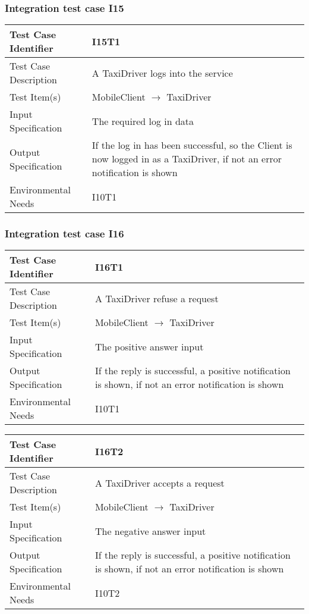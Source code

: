 		\subsubsection{Integration test case I15}
		\begin{center}
			\begin{tabular}{ |l p{10cm}| } \hline
				Test Case Identifier & I15T1 \\ \hline
				Test Case Description & A TaxiDriver logs into the service \\ \hline
				Test Item(s) & MobileClient $\rightarrow$ TaxiDriver \\ \hline
				Input Specification & The required log in data  \\ \hline
				Output Specification & If the log in has been successful, so the Client is now logged in as a TaxiDriver, if not an
				error notification is shown \\ \hline
				Environmental Needs & I10T1 \\ \hline
			\end{tabular}
		\end{center}
		\subsubsection{Integration test case I16}
		\begin{center}
			\begin{tabular}{ |l p{10cm}| } \hline
				Test Case Identifier & I16T1 \\ \hline
				Test Case Description & A TaxiDriver refuse a request \\ \hline
				Test Item(s) & MobileClient $\rightarrow$ TaxiDriver \\ \hline
				Input Specification & The positive answer input  \\ \hline
				Output Specification & If the reply is successful, a positive notification is shown, if not an error
				notification is shown\\ \hline
				Environmental Needs & I10T1 \\ \hline
			\end{tabular}
			\begin{tabular}{ |l p{10cm}| } \hline
				Test Case Identifier & I16T2 \\ \hline
				Test Case Description & A TaxiDriver accepts a request \\ \hline
				Test Item(s) & MobileClient $\rightarrow$ TaxiDriver \\ \hline
				Input Specification & The negative answer input \\ \hline
				Output Specification & If the reply is successful, a positive notification is shown, if not an error
				notification is shown\\ \hline
				Environmental Needs & I10T2 \\ \hline
			\end{tabular}
		\end{center}
